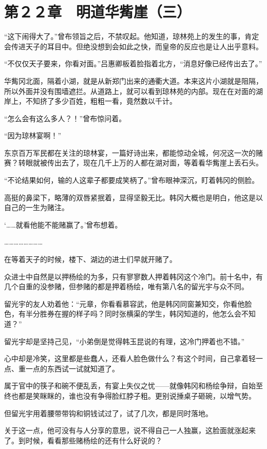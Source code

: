 \section{第２２章　明道华觜崖（三）}

“这下闹得大了。”曾布领旨之后，不禁叹起。他知道，琼林苑上的发生的事，肯定会传进天子的耳目中。但绝没想到会如此之快，而皇帝的反应也是让人出乎意料。

“不仅仅天子要来，你看对面。”吕惠卿板着脸指着北方，“消息好像已经传出去了。”

华觜冈北面，隔着小湖，就是从新郑门出来的通衢大道。本来这片小湖就是阻隔，所以外面并没有围墙遮拦。从道路上，就可以看到琼林苑的内部。现在在对面的湖岸上，不知挤了多少百姓，粗粗一看，竟然数以千计。

“怎么会有这么多人？！”曾布惊问着。

“因为琼林宴啊！”

东京百万军民都在关注的琼林宴，一篇好诗出来，都能惊动全城，何况这一次的赌赛？转眼就被传出去了，现在几千上万的人都在湖对面，等着看华觜崖上丢石头。

“不论结果如何，输的人这辈子都要成笑柄了。”曾布眼神深沉，盯着韩冈的侧脸。

高挺的鼻梁下，略薄的双唇紧抿着，显得坚毅无比。韩冈大概也是明白，他这是以自己的一生为赌注。

‘……就看他能不能赌赢了。’曾布想着。

……………………

在等着天子的时候，楼下、湖边的进士们早就开赌了。

众进士中自然是以押杨绘的为多，只有寥寥数人押着韩冈这个冷门。前十名中，有几个自重的没参赌，但参赌的都是押着杨绘，唯有第八名的留光宇与众不同。

留光宇的友人劝着他：“元章，你看看慕容武，他是韩冈同窗兼知交，你看他脸色，有半分胜券在握的样子吗？同时张横渠的学生，韩冈知道的，他怎么会不知道？”

留光宇却是坚持己见，“小弟倒是觉得韩玉昆说的有理，这冷门押着也不错。”

心中却是冷笑，这里都是些蠢人，还看人脸色做什么？有这个时间，自己拿着轻一点、重一点的东西试一试就知道了。

属于官中的筷子和碗不便乱丢，有宴上失仪之忧——就像韩冈和杨绘争辩，自始至终也都是笑眯眯的，谁也没有争得脸红脖子粗。更别说捶桌子砸碗，以增气势。

但留光宇用着腰带带钩和铜钱试过了，试了几次，都是同时落地。

关于这一点，他可没有与人分享的意思，说不得自己一人独赢，这脸面就涨起来了。到时候，看看那些赌杨绘的还有什么好说的？

